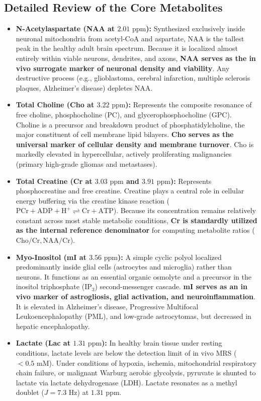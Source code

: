 \documentclass[11pt,a4paper]{article}
\begin{document}
\subsection{Detailed Review of the Core Metabolites}
\begin{itemize}[leftmargin=2em]
    \item \textbf{N-Acetylaspartate (NAA at $2.01\text{ ppm}$):} Synthesized exclusively inside neuronal mitochondria from acetyl-CoA and aspartate, NAA is the tallest peak in the healthy adult brain spectrum. Because it is localized almost entirely within viable neurons, dendrites, and axons, \textbf{NAA serves as the in vivo surrogate marker of neuronal density and viability}. Any destructive process (e.g., glioblastoma, cerebral infarction, multiple sclerosis plaques, Alzheimer's disease) depletes NAA.
    \item \textbf{Total Choline (Cho at $3.22\text{ ppm}$):} Represents the composite resonance of free choline, phosphocholine (PC), and glycerophosphocholine (GPC). Choline is a precursor and breakdown product of phosphatidylcholine, the major constituent of cell membrane lipid bilayers. \textbf{Cho serves as the universal marker of cellular density and membrane turnover}. Cho is markedly elevated in hypercellular, actively proliferating malignancies (primary high-grade gliomas and metastases).
    \item \textbf{Total Creatine (Cr at $3.03\text{ ppm}$ and $3.91\text{ ppm}$):} Represents phosphocreatine and free creatine. Creatine plays a central role in cellular energy buffering via the creatine kinase reaction ($\text{PCr} + \text{ADP} + \text{H}^+ \rightleftharpoons \text{Cr} + \text{ATP}$). Because its concentration remains relatively constant across most stable metabolic conditions, \textbf{Cr is standardly utilized as the internal reference denominator} for computing metabolite ratios ($\text{Cho}/\text{Cr}, \text{NAA}/\text{Cr}$).
    \item \textbf{Myo-Inositol (mI at $3.56\text{ ppm}$):} A simple cyclic polyol localized predominantly inside glial cells (astrocytes and microglia) rather than neurons. It functions as an essential organic osmolyte and a precursor in the inositol triphosphate ($\text{IP}_3$) second-messenger cascade. \textbf{mI serves as an in vivo marker of astrogliosis, glial activation, and neuroinflammation}. It is elevated in Alzheimer's disease, Progressive Multifocal Leukoencephalopathy (PML), and low-grade astrocytomas, but decreased in hepatic encephalopathy.
    \item \textbf{Lactate (Lac at $1.31\text{ ppm}$):} In healthy brain tissue under resting conditions, lactate levels are below the detection limit of in vivo MRS ($< 0.5\text{ mM}$). Under conditions of hypoxia, ischemia, mitochondrial respiratory chain failure, or malignant Warburg aerobic glycolysis, pyruvate is shunted to lactate via lactate dehydrogenase (LDH). Lactate resonates as a methyl doublet ($J = 7.3\text{ Hz}$) at $1.31\text{ ppm}$.
\end{itemize}
\end{document}
